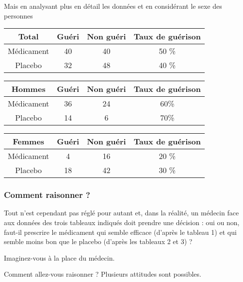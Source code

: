 \documentclass[10pt,dvipsnames, dvips, svgnames]{article}
\begin{document}
Mais en analysant plus en détail les données et en considérant le sexe des personnes

\begin{tabular}[]{|c |c |c |c |}
	\hline Total & Guéri & Non guéri & Taux de guérison \\
	\hline Médicament & 40  & 40  & 50 \% \\
	\hline Placebo & 32 &  48 & 40 \% \\
	\hline 
\end{tabular} 


\begin{tabular}[]{|c |c |c |c |}
	\hline Hommes & Guéri & Non guéri & Taux de guérison \\
	\hline Médicament & 36  & 24  & 60\% \\
	\hline Placebo & 14 & 6 & 70\% \\
	\hline 
\end{tabular} 




\begin{tabular}[]{|c |c |c |c |}
\hline  Femmes & Guéri & Non guéri &Taux de guérison \\
\hline Médicament & 4 & 16 & 20 \% \\
\hline   Placebo  & 18 & 42 & 30 \%  \\
\hline 
\end{tabular} 

\subsubsection{ Comment raisonner ?}

Tout n'est cependant pas réglé pour autant et, dans la réalité, un médecin face aux données des trois tableaux indiqués doit prendre une décision : oui ou non, faut-il prescrire le médicament qui semble efficace (d'après le tableau 1) et qui semble moins bon que le placebo (d'après les tableaux 2 et 3) ?

Imaginez-vous à la place du médecin.

Comment allez-vous raisonner ? Plusieurs attitudes sont possibles.
\end{document}
